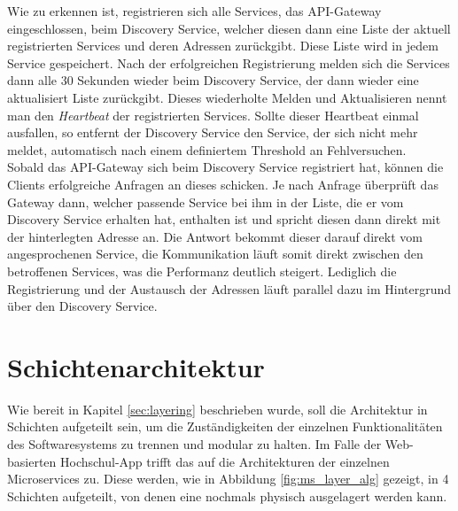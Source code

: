Wie zu erkennen ist, registrieren sich alle Services, das \ac{API}-Gateway eingeschlossen, beim Discovery Service, welcher diesen dann eine Liste der aktuell registrierten Services und deren Adressen zurückgibt. Diese Liste wird in jedem Service gespeichert. Nach der erfolgreichen Registrierung melden sich die Services dann alle 30 Sekunden wieder beim Discovery Service, der dann wieder eine aktualisiert Liste zurückgibt. Dieses wiederholte Melden und Aktualisieren nennt man den \textit{Heartbeat} der registrierten Services. Sollte dieser Heartbeat einmal ausfallen, so entfernt der Discovery Service den Service, der sich nicht mehr meldet, automatisch nach einem definiertem Threshold an Fehlversuchen. 
\\
\linebreak
Sobald das \ac{API}-Gateway sich beim Discovery Service registriert hat, können die Clients erfolgreiche Anfragen an dieses schicken. Je nach Anfrage überprüft das Gateway dann, welcher passende Service bei ihm in der Liste, die er vom Discovery Service erhalten hat, enthalten ist und spricht diesen dann direkt mit der hinterlegten Adresse an. Die Antwort bekommt dieser darauf direkt vom angesprochenen Service, die Kommunikation läuft somit direkt zwischen den betroffenen Services, was die Performanz deutlich steigert. Lediglich die Registrierung und der Austausch der Adressen läuft parallel dazu im Hintergrund über den Discovery Service. 

\section{Schichtenarchitektur\label{sec:schichtenarchitektur}}

Wie bereit in Kapitel \ref{sec:layering} beschrieben wurde, soll die Architektur in Schichten aufgeteilt sein, um die Zuständigkeiten der einzelnen Funktionalitäten des Softwaresystems zu trennen und modular zu halten. Im Falle der Web-basierten Hochschul-\ac{App} trifft das auf die Architekturen der einzelnen Microservices zu. Diese werden, wie in Abbildung \ref{fig:ms_layer_alg} gezeigt, in 4 Schichten aufgeteilt, von denen eine nochmals physisch ausgelagert werden kann.

